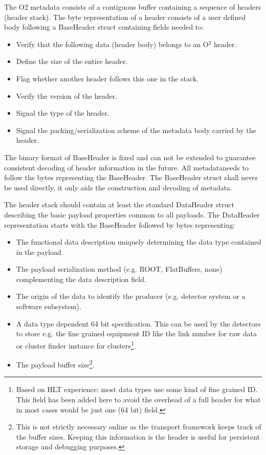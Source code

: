 \documentclass[a4paper,twoside]{article}
\def\O2{O$^2$}
\begin{document}
The O2 metadata consists of a contiguous buffer containing a sequence of headers (header stack).
The byte representation of a header consists of a user defined body following a BaseHeader struct containing fields needed to:
\begin{itemize}
  \item Verify that the following data (header body) belongs to an \O2 header.
  \item Define the size of the entire header.
  \item Flag whether another header follows this one in the stack.
  \item Verify the version of the header.
  \item Signal the type of the header.
  \item Signal the packing/serialization scheme of the metadata body carried by the header.
\end{itemize}

The binary format of BaseHeader is fixed and can not be extended to guarantee consistent decoding of header information in the future. All metadataneeds to follow the bytes representing the BaseHeader. The BaseHeader struct shall never be used directly, it only aids the construction and decoding of metadata.

The header stack should contain at least the standard DataHeader struct describing the basic payload properties common to all payloads. The DataHeader representation starts with the BaseHeader followed by bytes representing:
\begin{itemize}
  \item The functional data description uniquely determining the data type contained in the payload.
  \item The payload serialization method (e.g. ROOT, FlatBuffers, none) complementing the data description field.
  \item The origin of the data to identify the producer (e.g. detector system or a software subsystem).
  \item A data type dependent 64 bit specification. This can be used by the detectors to store e.g. the fine grained equipment ID like the link number for raw data or cluster finder instance for clusters\footnote{Based on HLT experience: most data types use some kind of fine grained ID. This field has been added here to avoid the overhead of a full header for what in most cases would be just one (64 bit) field.}.
  \item The payload buffer size\footnote{This is not strictly necessary online as the transport framework keeps track of the buffer sizes. Keeping this information is the header is useful for persistent storage and debugging purposes.}.
\end{itemize}
\end{document}
